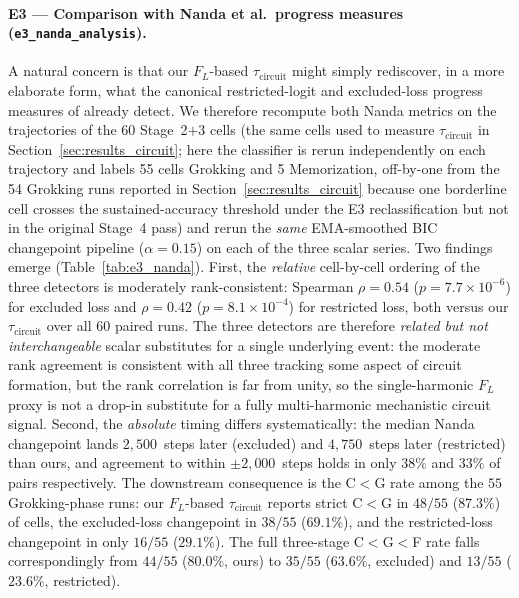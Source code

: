 \documentclass{article}
\newcommand{\taucirc}{\tau_{\mathrm{circuit}}}
\newcommand{\flogit}{F_{L}}
\begin{document}
\paragraph{E3 --- Comparison with Nanda et al.\ progress measures (\texttt{e3\_nanda\_analysis}).}
A natural concern is that our $\flogit$-based $\taucirc$ might
simply rediscover, in a more elaborate form, what the canonical
restricted-logit and excluded-loss progress measures of
\citet{nanda2023progress} already detect.
We therefore recompute both Nanda metrics on the trajectories of
the $60$ Stage~2$+$3 cells (the same cells used to measure
$\taucirc$ in Section~\ref{sec:results_circuit}; here the
classifier is rerun independently on each trajectory and labels
55 cells Grokking and 5 Memorization, off-by-one from the 54
Grokking runs reported in Section~\ref{sec:results_circuit}
because one borderline cell crosses the sustained-accuracy
threshold under the E3 reclassification but not in the original
Stage~4 pass) and rerun the \emph{same} EMA-smoothed BIC
changepoint pipeline ($\alpha{=}0.15$) on each of the three
scalar series.
Two findings emerge (Table~\ref{tab:e3_nanda}).
First, the \emph{relative} cell-by-cell ordering of the three
detectors is moderately rank-consistent: Spearman $\rho{=}0.54$
($p{=}7.7{\times}10^{-6}$) for excluded loss and $\rho{=}0.42$
($p{=}8.1{\times}10^{-4}$) for restricted loss, both versus our
$\taucirc$ over all 60 paired runs.
The three detectors are therefore \emph{related but not
interchangeable} scalar substitutes for a single underlying
event: the moderate rank agreement is consistent with all three
tracking some aspect of circuit formation, but the rank
correlation is far from unity, so the single-harmonic
$\flogit$ proxy is not a drop-in substitute for a fully
multi-harmonic mechanistic circuit signal.
Second, the \emph{absolute} timing differs systematically:
the median Nanda changepoint lands $2{,}500$~steps later
(excluded) and $4{,}750$~steps later (restricted) than ours, and
agreement to within $\pm 2{,}000$~steps holds in only
$38\%$ and $33\%$ of pairs respectively.
The downstream consequence is the C$<$G rate among the $55$
Grokking-phase runs: our $\flogit$-based $\taucirc$ reports
strict C$<$G in $48/55$ ($87.3\%$) of cells, the excluded-loss
changepoint in $38/55$ ($69.1\%$), and the restricted-loss
changepoint in only $16/55$ ($29.1\%$).
The full three-stage C$<$G$<$F rate falls correspondingly from
$44/55$ ($80.0\%$, ours) to $35/55$ ($63.6\%$, excluded) and
$13/55$ ($23.6\%$, restricted).
\end{document}
